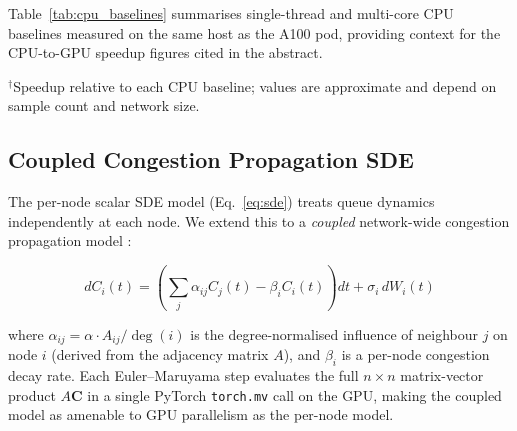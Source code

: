 \documentclass{ieeeaccess}
\begin{document}
Table~\ref{tab:cpu_baselines} summarises single-thread and multi-core CPU baselines measured on
the same host as the A100 pod, providing context for the CPU-to-GPU speedup figures cited in the
abstract.

\begin{table}[!t]
\caption{CPU Baseline Throughput (Intel Xeon, synthetic $n{=}500$,
         $N{=}10{,}000$ samples)}
\label{tab:cpu_baselines}
\centering
{}
\vspace{2pt}
\footnotesize
$^\dagger$Speedup relative to each CPU baseline; values are
approximate and depend on sample count and network size.
\end{table}

\subsection{Coupled Congestion Propagation SDE}
\label{subsec:spatial}

The per-node scalar SDE model (Eq.~\eqref{eq:sde}) treats queue dynamics independently at each
node. We extend this to a \emph{coupled} network-wide congestion propagation model
\cite{kang2007,harrison1985,mandelbaum2014stochastic}:

\begin{equation}
    dC_i(t) = \left(\sum_j \alpha_{ij} C_j(t) - \beta_i C_i(t)\right)dt
              + \sigma_i\, dW_i(t)
    \label{eq:coupled_sde}
\end{equation}

\noindent where $\alpha_{ij} = \alpha \cdot A_{ij} / \deg(i)$ is the degree-normalised influence
of neighbour $j$ on node $i$ (derived from the adjacency matrix $A$), and $\beta_i$ is a per-node
congestion decay rate. Each Euler--Maruyama step evaluates the full $n \times n$ matrix-vector
product $A\mathbf{C}$ in a single PyTorch \texttt{torch.mv} call on the GPU, making the coupled
model as amenable to GPU parallelism as the per-node model.
\end{document}
